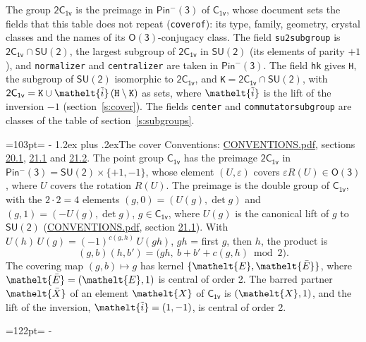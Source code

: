 \documentclass[10pt,a4paper]{article}
\makeatletter
\renewcommand\section{\@startsection{section}{1}{\z@}{-3ex plus -1ex minus -.2ex}%
  {1.2ex plus .2ex}{\normalfont\large\sffamily\bfseries\color{parttitle}}}
\newcommand{\needspace}[1]{\par\penalty-100\begingroup\dimen0=#1\relax\dimen2=\pagegoal
  \advance\dimen2-\pagetotal\ifdim\dimen0>\dimen2\relax\ifdim\dimen2>0pt\vfil\break\fi\fi
  \endgroup}
\numberwithin{equation}{section}
\newcommand{\eltfont}[1]{{\let\sigma\eltsigma\mathelt{#1}}}
\newcommand{\grp}[1]{\mathsf{#1}}
\newcommand{\elt}[1]{\eltfont{#1}}
\newcommand{\dirprod}{\times}
\newcommand{\barred}[1]{\bar{#1}}
\newcommand{\lift}[1]{\tilde{#1}}
\makeatother
\begin{document}
\leavevmode\label{n:element.inversion}\label{n:group.preimage}The group $\grp{2C_{1v}}$ is the preimage in $\grp{Pin^{-}(3)}$ of \href{../../../rotation/data/pdf/C1v.pdf}{$\grp{C_{1v}}$}, whose document sets the fields that this table does not repeat (\texttt{coverof}): its type, family, geometry, crystal classes and the names of its \href{../../../rotation/data/pdf/O3.pdf}{$\grp{O(3)}$}-conjugacy class. The field \texttt{su2subgroup} is $\grp{2C_{1v}} \cap \grp{SU(2)}$, the largest subgroup of $\grp{2C_{1v}}$ in $\grp{SU(2)}$ (its elements of parity $+1$), and \texttt{normalizer} and \texttt{centralizer} are taken in $\grp{Pin^{-}(3)}$. The field \texttt{hk} gives \texttt{H}, the subgroup of $\grp{SU(2)}$ isomorphic to $\grp{2C_{1v}}$, and \texttt{K}${} = \grp{2C_{1v}} \cap \grp{SU(2)}$, with $\grp{2C_{1v}} = \texttt{K} \cup \elt{\lift{i}}\,(\texttt{H} \setminus \texttt{K})$ as sets, where $\elt{\lift{i}}$ is the lift of the inversion $-1$ (section~\ref{s:cover}). The fields \texttt{center} and \texttt{commutatorsubgroup} are classes of the table of section~\ref{s:subgroups}.
\needspace{103pt}
\section{The cover}\label{s:cover}
Conventions: \href{../../CONVENTIONS.pdf}{CONVENTIONS.pdf}, sections \href{../../CONVENTIONS.pdf\#conv.20.1}{20.1}, \href{../../CONVENTIONS.pdf\#conv.21.1}{21.1} and \href{../../CONVENTIONS.pdf\#conv.21.2}{21.2}.
\leavevmode\label{n:group.pin.minus}\label{n:group.su2}\label{n:local.pin.sign}\label{n:matrix.covered}\label{n:matrix.lift.su2}\label{n:index.bar}The point group $\grp{C_{1v}}$ has the preimage $\grp{2C_{1v}}$ in $\grp{Pin^{-}(3)} = \grp{SU(2)} \dirprod \{+1, -1\}$, whose element $(U, \varepsilon)$ covers $\varepsilon R(U) \in \grp{O(3)}$, where $U$ covers the rotation $R(U)$. The preimage is the double group of $\grp{C_{1v}}$, with the $2 \cdot 2 = 4$ elements $(g, 0) = (U(g), \det g)$ and $(g, 1) = (-U(g), \det g)$, $g \in \grp{C_{1v}}$, where $U(g)$ is the canonical lift of $g$ to $\grp{SU(2)}$ (\href{../../CONVENTIONS.pdf}{CONVENTIONS.pdf}, section \href{../../CONVENTIONS.pdf\#conv.21.1}{21.1}). \label{n:function.cocycle}With $U(h)\,U(g) = (-1)^{c(g,h)}\,U(gh)$, $gh$ = first $g$, then $h$, the product is
\begin{equation}\label{e:product}(g, b)(h, b') = \bigl(gh,\ b + b' + c(g, h) \bmod 2\bigr).\end{equation}
\leavevmode\label{n:mark.bar}The covering map $(g, b) \mapsto g$ has kernel $\{\elt{E}, \elt{\barred{E}}\}$, where $\elt{\barred{E}} = (\elt{E}, 1)$ is central of order 2. \label{n:element.named}\label{n:mark.lift}The barred partner $\elt{\barred{X}}$ of an element $\elt{X}$ of $\grp{C_{1v}}$ is $(\elt{X}, 1)$, and the lift of the inversion, $\elt{\lift{i}} = (1, -1)$, is central of order 2.
\needspace{122pt}
\end{document}
